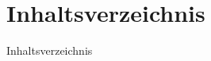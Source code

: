


\maketitle
  \section*{Inhaltsverzeichnis}
  \begin{frame}{Inhaltsverzeichnis}
    \tableofcontents
  \end{frame}


